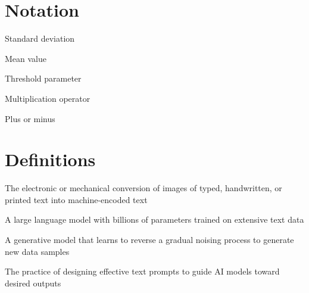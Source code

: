 
\section*{Notation}
\begin{description}[font=\rmfamily\bfseries, leftmargin=3cm, style=nextline]
	\item[$\sigma$] Standard deviation
	\item[$\mu$] Mean value
	\item[$\alpha$] Threshold parameter
	\item[$\times$] Multiplication operator
	\item[$\pm$] Plus or minus
\end{description}

\section*{Definitions}
\begin{description}[font=\rmfamily\bfseries, leftmargin=3cm, style=nextline]
	\item[OCR] The electronic or mechanical conversion of images of typed, handwritten, or printed text into machine-encoded text
	\item[LLM] A large language model with billions of parameters trained on extensive text data
	\item[Diffusion Model] A generative model that learns to reverse a gradual noising process to generate new data samples
	\item[Prompt Engineering] The practice of designing effective text prompts to guide AI models toward desired outputs
\end{description}

